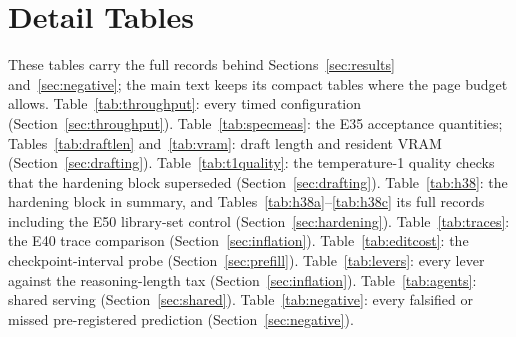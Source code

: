 \documentclass[11pt]{article}
\begin{document}



\clearpage
\appendix
\renewcommand{\thetable}{A\arabic{table}}
\renewcommand{\theHtable}{A\arabic{table}}
\setcounter{table}{0}

\section{Detail Tables}
\label{app:tables}

These tables carry the full records behind Sections~\ref{sec:results}
and~\ref{sec:negative}; the main text keeps its compact tables where the
page budget allows. Table~\ref{tab:throughput}: every timed configuration
(Section~\ref{sec:throughput}). Table~\ref{tab:specmeas}: the E35
acceptance quantities; Tables~\ref{tab:draftlen} and~\ref{tab:vram}: draft
length and resident VRAM (Section~\ref{sec:drafting}). Table~\ref{tab:t1quality}: the temperature-1
quality checks that the hardening block superseded
(Section~\ref{sec:drafting}). Table~\ref{tab:h38}: the hardening block in
summary, and Tables~\ref{tab:h38a}--\ref{tab:h38c} its full records
including the E50 library-set control (Section~\ref{sec:hardening}).
Table~\ref{tab:traces}: the E40 trace comparison
(Section~\ref{sec:inflation}). Table~\ref{tab:editcost}: the checkpoint-interval probe
(Section~\ref{sec:prefill}). Table~\ref{tab:levers}: every lever against the
reasoning-length tax (Section~\ref{sec:inflation}). Table~\ref{tab:agents}:
shared serving (Section~\ref{sec:shared}). Table~\ref{tab:negative}: every
falsified or missed pre-registered prediction (Section~\ref{sec:negative}).
\end{document}
